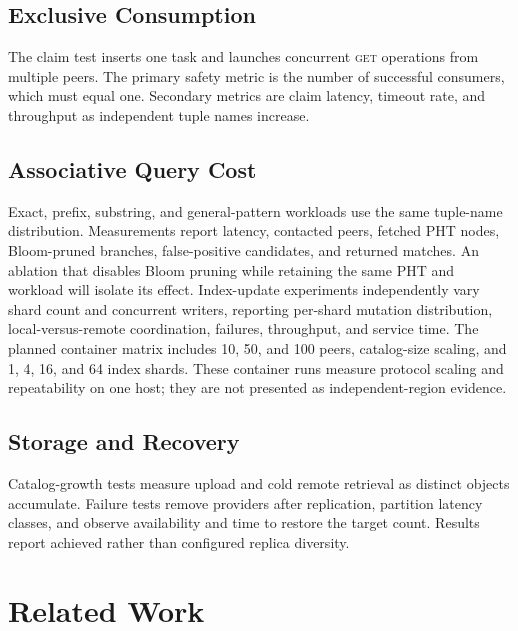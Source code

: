 \documentclass[conference]{IEEEtran}
\newcommand{\getop}{\textsc{get}\xspace}
\begin{document}

\subsection{Exclusive Consumption}

The claim test inserts one task and launches concurrent \getop operations from
multiple peers. The primary safety metric is the number of successful
consumers, which must equal one. Secondary metrics are claim latency, timeout
rate, and throughput as independent tuple names increase.

\subsection{Associative Query Cost}

Exact, prefix, substring, and general-pattern workloads use the same tuple-name
distribution. Measurements report latency, contacted peers, fetched PHT nodes,
Bloom-pruned branches, false-positive candidates, and returned matches. An
ablation that disables Bloom pruning while retaining the same PHT and workload
will isolate its effect. Index-update experiments independently vary shard
count and concurrent writers, reporting per-shard mutation distribution,
local-versus-remote coordination, failures, throughput, and service time.
The planned container matrix includes 10, 50, and 100 peers, catalog-size
scaling, and 1, 4, 16, and 64 index shards. These container runs measure
protocol scaling and repeatability on one host; they are not presented as
independent-region evidence.

\subsection{Storage and Recovery}

Catalog-growth tests measure upload and cold remote retrieval as distinct
objects accumulate. Failure tests remove providers after replication,
partition latency classes, and observe availability and time to restore the
target count. Results report achieved rather than configured replica diversity.

\section{Related Work}
\label{sec:related}
\end{document}
